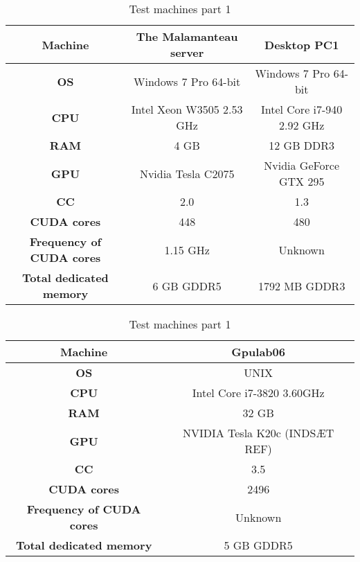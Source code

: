 \begin{table}
\begin{center}
\begin{tabular}{|c|c|c|}
	\hline
	\multicolumn{1}{|m{2.8cm}|}{\centering \textbf{Machine}} & The Malamanteau server & Desktop PC1 \\ \hline
	\multicolumn{1}{|m{2.8cm}|}{\centering \textbf{OS}} & Windows 7 Pro 64-bit & Windows 7 Pro 64-bit\\ \hline
	\multicolumn{1}{|m{2.8cm}|}{\centering \textbf{CPU}} & Intel Xeon W3505 2.53 GHz & Intel Core i7-940 2.92 GHz \\ \hline
	\multicolumn{1}{|m{2.8cm}|}{\centering \textbf{RAM}} & 4 GB & 12 GB DDR3\\ \hline
	\multicolumn{1}{|m{2.8cm}|}{\centering \textbf{GPU}} & Nvidia Tesla C2075\cite{tesl} & Nvidia GeForce GTX 295 \cite{gtxx}\\ \hline
	\multicolumn{1}{|m{2.8cm}|}{\centering \textbf{CC}} & 2.0 & 1.3\\ \hline
	\multicolumn{1}{|m{2.8cm}|}{\centering \textbf{CUDA cores}} & 448 & 480\\ \hline
	\multicolumn{1}{|m{2.8cm}|}{\centering \textbf{Frequency of CUDA cores}} & 1.15 GHz & Unknown\\ \hline
	\multicolumn{1}{|m{2.8cm}|}{\centering \textbf{Total dedicated memory}} & 6 GB GDDR5 & 1792 MB GDDR3\\ \hline
\end{tabular}
\end{center}
\caption{Test machines part 1}
\end{table}

\begin{table}
\begin{center}
\begin{tabular}{|c|c|}
	\hline
	\multicolumn{1}{|m{2.8cm}|}{\centering \textbf{Machine}} & Gpulab06 \\ \hline
	\multicolumn{1}{|m{2.8cm}|}{\centering \textbf{OS}} & UNIX \\ \hline
	\multicolumn{1}{|m{2.8cm}|}{\centering \textbf{CPU}} & Intel Core i7-3820 3.60GHz \\ \hline
	\multicolumn{1}{|m{2.8cm}|}{\centering \textbf{RAM}} & 32 GB \\ \hline
	\multicolumn{1}{|m{2.8cm}|}{\centering \textbf{GPU}} & NVIDIA Tesla K20c (INDSÆT REF) \\ \hline
	\multicolumn{1}{|m{2.8cm}|}{\centering \textbf{CC}} & 3.5 \\ \hline
	\multicolumn{1}{|m{2.8cm}|}{\centering \textbf{CUDA cores}} & 2496 \\ \hline
	\multicolumn{1}{|m{2.8cm}|}{\centering \textbf{Frequency of CUDA cores}} & Unknown \\ \hline
	\multicolumn{1}{|m{2.8cm}|}{\centering \textbf{Total dedicated memory}} & 5 GB GDDR5 \\ \hline
\end{tabular}
\end{center}
\caption{Test machines part 1}
\end{table}

